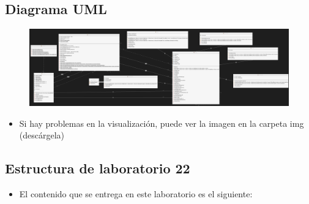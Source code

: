 \documentclass{article}
\begin{document}
	
	
	\subsection{Diagrama UML}
	
	\begin{figure}[H]
		\centering
		\includegraphics[width=1\textwidth,keepaspectratio]{img/uml.png}
	\end{figure}
	
	\begin{itemize}	
			\item Si hay problemas en la visualización, puede ver la imagen en la carpeta img (descárgela)
	\end{itemize}
	
	
	
	
	
	\subsection{Estructura de laboratorio 22}
	\begin{itemize}	
		\item El contenido que se entrega en este laboratorio es el siguiente:
	\end{itemize}
	
\end{document}
